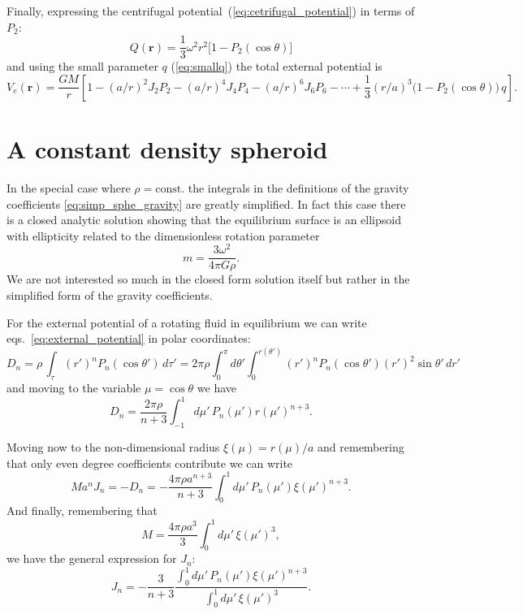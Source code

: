 \documentclass[amsmath,amsfonts,rmp,letterpaper]{revtex4}
\newcommand{\V}[1]{\mathbf{#1}} %
\newcommand{\arr}{\V{r}}
\newcommand{\om}{\omega}
\newcommand{\const}{\mathrm{const.}}
\begin{document}
Finally, expressing the centrifugal potential~(\ref{eq:cetrifugal_potential}) in
terms of $P_2$:
\begin{equation}
Q(\arr) = \frac{1}{3}\omega^2r^2\bigl[1 - P_2(\cos\theta)\bigr]
\end{equation}
and using the small parameter $q$ (\ref{eq:smallq}) the total external potential
is
\begin{equation}\label{eq:total_external_potential}
V_e(\arr) = \frac{GM}{r}\left[1 - (a/r)^2J_2P_2 - (a/r)^4J_4P_4 -
(a/r)^6J_6P_6 - \cdots + \frac{1}{3}(r/a)^3\bigl(1 - 
P_2(\cos\theta)\bigr)\,q\right].
\end{equation}


\section{A constant density spheroid} %
\label{sec:a_constant_density_spheroid}
In the special case where $\rho=\const$ the integrals in the definitions of the
gravity coefficients \eqref{eq:simp_sphe_gravity} are greatly simplified. In fact
this case there is a closed analytic solution showing that the equilibrium surface
is an ellipsoid with ellipticity related to the dimensionless rotation parameter
\begin{equation}
m = \frac{3\om^2}{4\pi{G}\rho}.
\end{equation}
We are not interested so much in the closed form solution itself but rather in
the simplified form of the gravity coefficients.

For the external potential of a rotating fluid in equilibrium we can write
eqs.~\eqref{eq:external_potential} in polar coordinates:
\begin{equation}
D_n = \rho\,\int_\tau (r')^nP_n(\cos\theta')\,d\tau' =
2\pi\rho\int_{0}^{\pi}d\theta'\int_{0}^{r(\theta')}(r')^nP_n(\cos\theta')
(r')^2\sin\theta'\,dr'
\end{equation}
and moving to the variable $\mu=\cos\theta$ we have
\begin{equation}
D_n = \frac{2\pi\rho}{n + 3}\int_{-1}^{1}d\mu'\,P_n(\mu')r(\mu')^{n + 3}.
\end{equation}

Moving now to the non-dimensional radius $\xi(\mu) = r(\mu)/a$ and remembering
that only even degree coefficients contribute we can write
\begin{equation}
Ma^nJ_n = -D_n =
-\frac{4\pi\rho{}a^{n + 3}}{n + 3}\int_{0}^{1}d\mu'\,P_n(\mu')\xi(\mu')^{n + 3}.
\end{equation}
And finally, remembering that
\begin{equation}
M = \frac{4\pi\rho{}a^3}{3}\int_{0}^{1}d\mu'\,\xi(\mu')^3,
\end{equation}
we have the general expression for $J_n$:
\begin{equation}\label{eq:Jn_maclaurin_ext}
J_n = -\frac{3}{n + 3}\frac{\int_{0}^{1}d\mu'\,P_n(\mu')\xi(\mu')^{n+3}}{\int_{0}^
{1}d\mu'\,\xi(\mu')^3}.
\end{equation}




\end{document}
